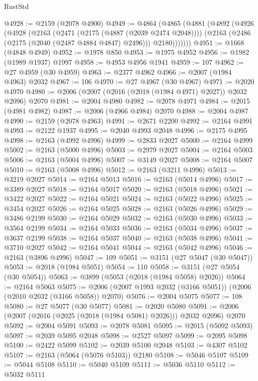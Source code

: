 \begin{lexlean}{RustStd}
\begin{coremodule}
@4928 := @2159 (@2078 @4900)
@4949 := @4864
    (@4865
      (@4881
        (@4892
          (@4926
            (@4928
              (@2163
                (@2471 (@2175 (@4887 (@2039 @2474 @2048))))
                (@2163 (@2486 (@2175 (@2040 (@2487 @4884 @4847) @2496))) @2180)))))))
@4951 := @1668 (@4848 @4949)
@4952 := @1978 @850
@4953 := @1975 @4952
@4956 := @1982 (@1989 @1937) @1997
@4958 := @4953 @4956 @1941
@4959 := 107
@4962 := @27 @4959 (@30 @4959)
@4963 := @2377 @4962
@4966 := @2007 (@1984 @4963) @2032
@4967 := 106
@4970 := @27 @4967 (@30 @4967)
@4971 := @2020 @4970
@4980 := @2006 (@2007 (@2016 (@2018 (@1984 @4971) @2027)) @2032 @2096) @2070
@4981 := @2004 @4980
@4982 := @2078 @4971
@4984 := @2015 (@4981 @4982)
@4987 := @2006 (@4966 @4984) @2070
@4988 := @2004 @4987
@4990 := @2159 (@2078 @4963)
@4991 := @2671 @2200
@4992 := @2164 @4991
@4993 := @2122 @1937
@4995 := @2040 @4993 @2048
@4996 := @2175 @4995
@4998 := @2163 (@4992 @4996)
@4999 := @2833 @2027
@5000 := @2164 @4999
@5002 := @2163 (@5000 @4996)
@5003 := @2979 @2027
@5004 := @2164 @5003
@5006 := @2163 (@5004 @4996)
@5007 := @3149 @2027
@5008 := @2164 @5007
@5010 := @2163 (@5008 @4996)
@5012 := @2163 (@3211 @4996)
@5013 := @3219 @2027
@5014 := @2164 @5013
@5016 := @2163 (@5014 @4996)
@5017 := @3389 @2027
@5018 := @2164 @5017
@5020 := @2163 (@5018 @4996)
@5021 := @3422 @2027
@5022 := @2164 @5021
@5024 := @2163 (@5022 @4996)
@5025 := @3454 @2027
@5026 := @2164 @5025
@5028 := @2163 (@5026 @4996)
@5029 := @3486 @2199
@5030 := @2164 @5029
@5032 := @2163 (@5030 @4996)
@5033 := @3564 @2199
@5034 := @2164 @5033
@5036 := @2163 (@5034 @4996)
@5037 := @3637 @2199
@5038 := @2164 @5037
@5040 := @2163 (@5038 @4996)
@5041 := @3710 @2027
@5042 := @2164 @5041
@5044 := @2163 (@5042 @4996)
@5046 := @2163 (@3896 @4996)
@5047 := 109
@5051 := @3151 (@27 @5047 (@30 @5047))
@5053 := @2018 (@1984 @5051)
@5054 := 110
@5058 := @3151 (@27 @5054 (@30 @5054))
@5063 := @3899 (@5053 (@2018 (@1984 @5058) @2026))
@5064 := @2164 @5063
@5075 := @2006 (@2007 @1993 @2032 (@3166 @5051)) (@2006 (@2010 @2032 (@3166 @5058)) @2070)
@5076 := @2004 @5075
@5077 := 108
@5080 := @27 @5077 (@30 @5077)
@5081 := @2020 @5080
@5091 := @2006 (@2007 (@2016 (@2025 (@2018 (@1984 @5081) @2026))) @2032 @2096) @2070
@5092 := @2004 @5091
@5093 := @2078 @5081
@5095 := @2015 (@5092 @5093)
@5097 := @2039 @5095 @2048
@5098 := @2527 @5097
@5099 := @2095 @5098
@5100 := @2422 @5099
@5102 := @2039 @5100 @2048
@5103 := @4307 @5102
@5107 := @2163 (@5064 (@5076 @5103)) @2180
@5108 := @5046 @5107
@5109 := @5044 @5108
@5110 := @5040 @5109
@5111 := @5036 @5110
@5112 := @5032 @5111

\end{coremodule}
\end{lexlean}
